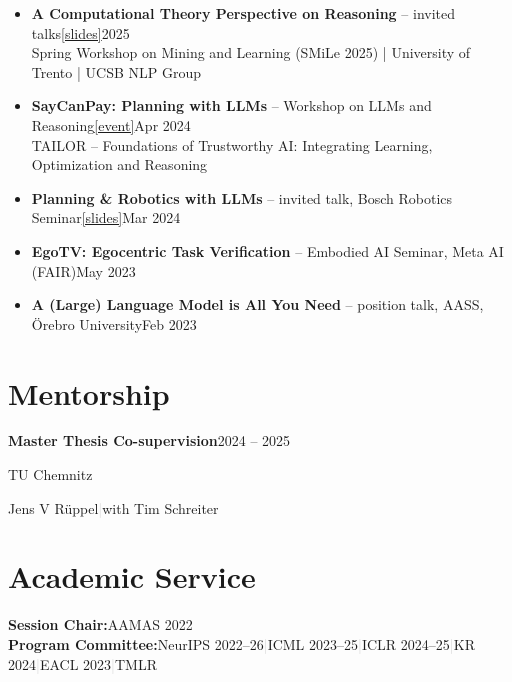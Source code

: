 \documentclass[a4paper,10pt]{article}
\newcommand{\cventry}[4]{%
  {\sffamily\bfseries #1}\hfill{\small\color{subtle}#3}\par\nopagebreak
  {\small\color{subtle}#2}\par\nopagebreak
  {\small #4}\par\vspace{0.6em}%
}
\newenvironment{cvitems}
  {\begin{itemize}[leftmargin=1.1em, label={\textbullet}, topsep=2pt, itemsep=2pt, parsep=0pt]}
  {\end{itemize}}
\newcommand{\cvlink}[2]{\href{#2}{\small\textcolor{accent}{[#1]}}}
\begin{document}
\begin{cvitems}
  \item \textbf{A Computational Theory Perspective on Reasoning} -- invited talks\;\cvlink{slides}{https://drive.google.com/file/d/1VBbR58PpwZxGzHX4oekuTLqXttsPl_Fs/view?usp=sharing}\hfill{\small\color{subtle}2025}\\
  Spring Workshop on Mining and Learning (SMiLe 2025) \textcolor{subtle}{|} University of Trento \textcolor{subtle}{|} UCSB NLP Group
  \item \textbf{SayCanPay: Planning with LLMs} -- Workshop on LLMs and Reasoning\;\cvlink{event}{https://tailor-network.eu/events/workshop-on-the-integration-of-large-language-models-and-reasoning-april-19th-1300-1700-cet/}\hfill{\small\color{subtle}Apr 2024}\\
  TAILOR -- Foundations of Trustworthy AI: Integrating Learning, Optimization and Reasoning
  \item \textbf{Planning \& Robotics with LLMs} -- invited talk, Bosch Robotics Seminar\;\cvlink{slides}{https://docs.google.com/presentation/d/19LzeK6ovSO2f-Q98VhaO6qdNBZadTYfenYFjaZM-l_w/edit?usp=sharing}\hfill{\small\color{subtle}Mar 2024}
  \item \textbf{EgoTV: Egocentric Task Verification} -- Embodied AI Seminar, Meta AI (FAIR)\hfill{\small\color{subtle}May 2023}
  \item \textbf{A (Large) Language Model is All You Need} -- position talk, AASS, \"{O}rebro University\hfill{\small\color{subtle}Feb 2023}
\end{cvitems}

\section{Mentorship}

\cventry{Master Thesis Co-supervision}{TU Chemnitz}{2024 -- 2025}{%
  Jens V R\"uppel\;\textcolor{lightgray}{|}\;with Tim Schreiter}

\section{Academic Service}

\textbf{Session Chair:}\;AAMAS 2022\\[2pt]
\textbf{Program Committee:}\;NeurIPS 2022--26\;\textcolor{lightgray}{|}\;ICML 2023--25\;\textcolor{lightgray}{|}\;ICLR 2024--25\;\textcolor{lightgray}{|}\;KR 2024\;\textcolor{lightgray}{|}\;EACL 2023\;\textcolor{lightgray}{|}\;TMLR

\vspace{0.5em}
\end{document}
